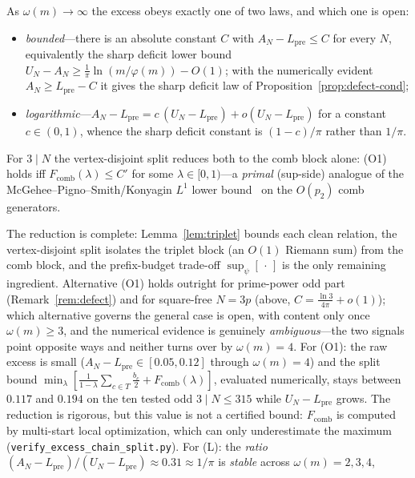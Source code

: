 \begin{conjecture}\label{conj:excess}
As $\omega(m)\to\infty$ the excess obeys exactly one of two laws, and which one is open:
\begin{itemize}
\item[\textup{(O1)}] \emph{bounded}---there is an absolute constant $C$ with $A_N-L_{\mathrm{pre}}\le C$ for
every $N$, equivalently the sharp deficit lower bound $U_N-A_N\ge\tfrac1\pi\ln(m/\varphi(m))-O(1)$; with
the numerically evident $A_N\ge L_{\mathrm{pre}}-C$ it gives the sharp deficit law of
Proposition~\ref{prop:defect-cond};
\item[\textup{(L)}] \emph{logarithmic}---$A_N-L_{\mathrm{pre}}=c\,(U_N-L_{\mathrm{pre}})+o(U_N-L_{\mathrm{pre}})$
for a constant $c\in(0,1)$, whence the sharp deficit constant is $(1-c)/\pi$ rather than $1/\pi$.
\end{itemize}
For $3\mid N$ the vertex-disjoint split reduces both to the comb block alone: \textup{(O1)} holds iff
$F_{\mathrm{comb}}(\lambda)\le C'$ for some $\lambda\in[0,1)$---a \emph{primal} (sup-side) analogue of the
McGehee--Pigno--Smith/Konyagin $L^1$ lower bound~\cite{MPS81,Konyagin81} on the $O(p_2)$ comb generators.
\end{conjecture}
\noindent The reduction is complete: Lemma~\ref{lem:triplet} bounds each clean relation, the vertex-disjoint
split isolates the triplet block (an $O(1)$ Riemann sum) from the comb block, and the prefix-budget trade-off
$\sup_\psi[\,\cdot\,]$ is the only remaining ingredient. Alternative \textup{(O1)} holds outright for
prime-power odd part (Remark~\ref{rem:defect}) and for square-free $N=3p$ (above, $C=\tfrac{\ln3}{4\pi}+o(1)$);
which alternative governs the general case is open, with content only once $\omega(m)\ge3$, and the numerical
evidence is genuinely \emph{ambiguous}---the two signals point opposite ways and neither turns over by
$\omega(m)=4$. For \textup{(O1)}: the raw excess is small ($A_N-L_{\mathrm{pre}}\in[0.05,0.12]$ through
$\omega(m)=4$) and the split bound
$\min_\lambda[\tfrac1{1-\lambda}\sum_{c\in T}\tfrac{b_c}2+F_{\mathrm{comb}}(\lambda)]$, evaluated numerically,
stays between $0.117$ and $0.194$ on the ten tested odd $3\mid N\le315$ while $U_N-L_{\mathrm{pre}}$ grows. The
reduction is rigorous, but this value is not a certified bound: $F_{\mathrm{comb}}$ is computed by multi-start
local optimization, which can only underestimate the maximum (\texttt{verify\_excess\_chain\_split.py}). For \textup{(L)}: the \emph{ratio}
$(A_N-L_{\mathrm{pre}})/(U_N-L_{\mathrm{pre}})\approx0.31\approx1/\pi$ is \emph{stable} across $\omega(m)=2,3,4$,
